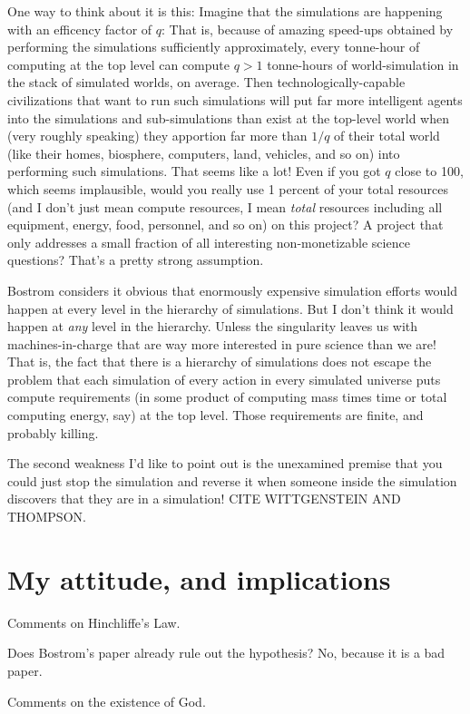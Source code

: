 \documentclass[12pt,letterpaper]{article}
\begin{document}
One way to think about it is this: Imagine that the simulations are
happening with an efficency factor of $q$: That is, because of amazing
speed-ups obtained by performing the simulations sufficiently
approximately, every tonne-hour of computing at the top level can
compute $q>1$ tonne-hours of world-simulation in the stack of
simulated worlds, on average. Then technologically-capable
civilizations that want to run such simulations will put far more
intelligent agents into the simulations and sub-simulations than exist
at the top-level world when (very roughly speaking) they apportion far
more than $1/q$ of their total world (like their homes, biosphere,
computers, land, vehicles, and so on) into performing such
simulations. That seems like a lot! Even if you got $q$ close to 100,
which seems implausible, would you really use 1 percent of your total
resources (and I don't just mean compute resources, I mean
\emph{total} resources including all equipment, energy, food,
personnel, and so on) on this project? A project that only addresses a
small fraction of all interesting non-monetizable science questions?
That's a pretty strong assumption.

Bostrom considers it obvious that enormously expensive simulation
efforts would happen at every level in the hierarchy of
simulations. But I don't think it would happen at \emph{any} level in
the hierarchy. Unless the singularity leaves us with
machines-in-charge that are way more interested in pure science than
we are! That is, the fact that there is a hierarchy of simulations
does not escape the problem that each simulation of every action in
every simulated universe puts compute requirements (in some product of
computing mass times time or total computing energy, say) at the top
level. Those requirements are finite, and probably killing.

The second weakness I'd like to point out is the unexamined premise
that you could just stop the simulation and reverse it when someone
inside the simulation discovers that they are in a simulation! CITE
WITTGENSTEIN AND THOMPSON.

\section{My attitude, and implications}

Comments on Hinchliffe's Law.

Does Bostrom's paper already rule out the hypothesis? No, because it
is a bad paper.

Comments on the existence of God.
\end{document}
